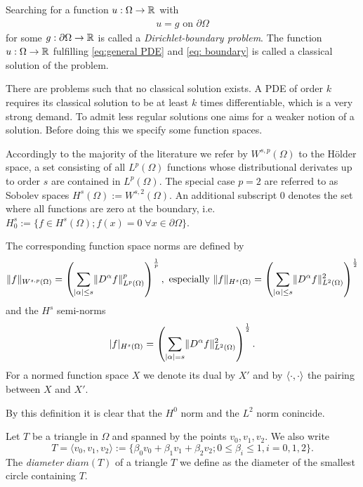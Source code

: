Searching for a function $u:\Omega \rightarrow \mathbb{R}$ with 
\begin{align}
u=g \text{ on } \partial \Omega \label{eq: boundary}
\end{align}
for some $g:\partial \Omega \rightarrow \mathbb{R}$ is called a \emph{Dirichlet-boundary problem}. The function $u:\Omega \rightarrow \mathbb{R}$ fulfilling \eqref{eq:general PDE} and \eqref{eq: boundary} is called a classical solution of the problem. 

There are problems such that no classical solution exists. A PDE of order $k$ requires its classical solution to be at least $k$ times differentiable, which is a very strong demand. To admit less regular solutions one aims for a weaker notion of a solution. Before doing this we specify some function spaces.

\begin{definition} \label{def: function spaces and norms}
Accordingly to the majority of the literature we refer by $W^{s,p}(\Omega)$ to the H\"older space, a set consisting of all $L^p(\Omega)$ functions whose distributional derivates up to order $s$ are contained in $L^ p(\Omega)$.
The special case $p=2$ are referred to as Sobolev spaces $H^s(\Omega):=W^{s,2}(\Omega)$. An additional subscript $0$ denotes the set where all functions are zero at the boundary, i.e. $H^s_0 :=\{f \in H^s(\Omega); f(x)=0 \; \forall x \in \partial \Omega\}$.

The corresponding function space norms are defined by
\[
	\lVert f \rVert _{W^{s,p}(\Omega)} = \left( \sum_{|\alpha| \leq s} \lVert D^\alpha f \rVert^p_{L^p(\Omega)}\right)^{\frac 1 p }, \text{   especially } \lVert f \rVert _{H^{s}(\Omega)}=\left( \sum_{|\alpha| \leq s} \lVert D^\alpha f \rVert^2_{L^2(\Omega)}\right)^{\frac 1 2 }
\]
and the $H^s$ semi-norms
\[ 
 	|f|_{H^{s}(\Omega)}=\left( \sum_{|\alpha| = s} \lVert D^\alpha f \rVert^2_{L^2(\Omega)}\right)^{\frac 1 2 }.
\]
For a normed function space $X$ we denote its dual by $X'$ and by $ \langle \cdot, \cdot \rangle$ the pairing between $X$ and $X'$.

\end{definition}
By this definition it is clear that the $H^0$ norm and the $L^2$ norm conincide. 

Let $T$ be a triangle in $\Omega$ and spanned by the points $v_0, v_1, v_2$. We also write 
\[
	T= \langle v_0, v_1, v_2 \rangle := \{\beta_0 v_0+ \beta_1 v_1 +\beta_2 v_2; 0 \leq \beta_i \leq 1, i= 0,1,2\}.
\]
The \emph{diameter} $diam(T)$ of a triangle $T$ we define as the diameter of the smallest circle containing $T$.

